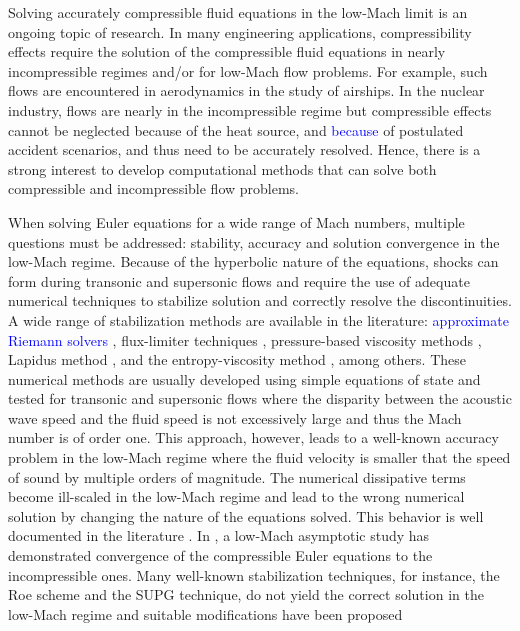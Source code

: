 \documentclass[preprint,10pt]{elsarticle}
\newcommand{\tcb}[1]{\textcolor{blue}{#1}}
\begin{document}
Solving accurately compressible fluid equations in the low-Mach limit is an ongoing topic of research. 
In many engineering applications, compressibility effects require the solution of the compressible fluid equations
in nearly incompressible regimes and/or for low-Mach flow problems. For example, such flows are encountered 
in aerodynamics in the study of airships. In the nuclear industry, flows are nearly in the incompressible regime but 
compressible effects cannot be neglected because of the heat source, and \tcb{because} of postulated accident scenarios, 
and thus need to be accurately resolved. Hence, there is a strong interest to develop computational methods 
that can solve both compressible and incompressible flow problems.  

When solving Euler equations for a wide range of Mach numbers, multiple questions must be addressed: stability, 
accuracy and solution convergence in the low-Mach regime. Because of the hyperbolic nature of the equations, 
shocks can form during transonic and supersonic flows and require the use of adequate numerical techniques to stabilize solution
and correctly resolve the discontinuities. A wide range of stabilization methods are available in the literature: \tcb{approximate Riemann solvers} \cite{Toro}, flux-limiter techniques 
\cite{FluxLimiter, FluxLimiter2}, pressure-based viscosity methods \cite{PBV_book}, Lapidus method \cite{Lapidus_paper, LMP, Lapidus_book}, 
and the entropy-viscosity method \cite{jlg1, jlg2}, among others. These numerical methods are usually developed using simple equations 
of state and tested for transonic and supersonic flows where the disparity between the acoustic wave speed and the fluid speed is not 
excessively large and thus the Mach number is of order one. This approach, however, leads to a well-known accuracy problem in the low-Mach regime 
where the fluid velocity is smaller that the speed of sound by multiple orders of magnitude. The numerical dissipative terms become 
ill-scaled in the low-Mach regime and lead to the wrong numerical solution by changing the nature of the equations solved. This 
behavior is well documented in the literature \cite{LowMach1, LowMach2, LowMach3}.
In \cite{LowMach1}, a low-Mach asymptotic study has demonstrated convergence of the 
compressible Euler equations to the incompressible ones. 
Many well-known stabilization techniques, for instance, the Roe scheme and the SUPG technique,
do not yield the correct solution in the low-Mach regime and suitable modifications have been proposed \cite{Roe,LowMach3}
\end{document}
